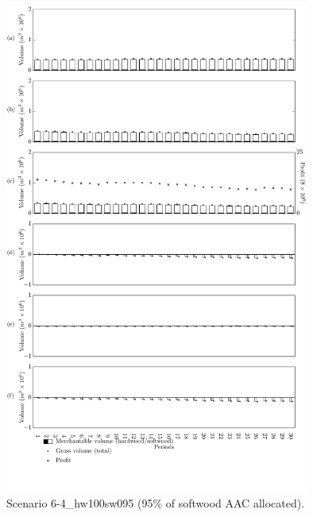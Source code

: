 \begin{figure}[h]
  \centering
  \includegraphics[width=10cm]{images/appendix/s6-4_hw100sw095}
  \caption{Scenario 6-4\_hw100sw095 (95\% of softwood AAC allocated).}
  \label{fig:s6-4_hw100sw095}
\end{figure}

